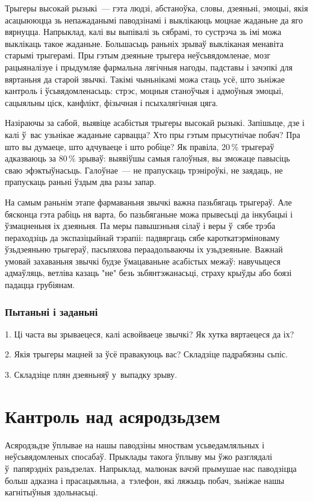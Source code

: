Трыгеры высокай рызыкі~--- гэта людзі, абстаноўка, словы, дзеяньні, эмоцыі, якія асацыююцца зь непажаданымі паводзінамі і выклікаюць моцнае жаданьне да яго вярнуцца. Напрыклад, калі вы выпівалі зь сябрамі, то сустрэча зь імі можа выклікаць такое жаданьне. Большасьць раньніх зрываў выкліканая менавіта старымі трыгерамі. Пры гэтым дзеяньне трыгера неўсьвядомленае, мозг рацыяналізуе і прыдумляе фармальна лягічныя нагоды, падставы і зачэпкі для вяртаньня да старой звычкі. Такімі чыньнікамі можа стаць усё, што зьніжае кантроль і ўсьвядомленасьць: стрэс, моцныя станоўчыя і адмоўныя эмоцыі, сацыяльны ціск, канфлікт, фізычная і псыхалягічная цяга.

Назіраючы за сабой, выявіце асабістыя трыгеры высокай рызыкі. Запішыце, дзе і калі ў~вас узьнікае жаданьне сарвацца? Хто пры гэтым прысутнічае побач? Пра што вы думаеце, што адчуваеце і што робіце? Як правіла, 20\,\% трыгераў адказваюць за 80\,\% зрываў: выявіўшы самыя галоўныя, вы зможаце павысіць сваю эфэктыўнасьць. Галоўнае~--- не прапускаць трэніроўкі, не заядаць, не прапускаць раньні ўздым два разы запар.

На самым раньнім этапе фармаваньня звычкі важна пазьбягаць трыгераў. Але бясконца гэта рабіць ня варта, бо пазьбяганьне можа прывесьці да інкубацыі і ўзмацненьня іх дзеяньня. Па меры павышэньня сілаў і веры ў~сябе трэба пераходзіць да экспазіцыйнай тэрапіі: падвяргаць сябе кароткатэрміноваму ўзьдзеяньню трыгераў, пасьпяхова пераадольваючы іх узьдзеяньне. Важнай умовай захаваньня звычкі будзе ўмацаваньне асабістых межаў: навучыцеся адмаўляць, ветліва казаць "не" безь зьбянтэжанасьці, страху крыўды або боязі падацца грубіянам.

\subsubsection{Пытаньні і заданьні}

1. Ці часта вы зрываецеся, калі асвойваеце звычкі? Як хутка вяртаецеся да іх?

2. Якія трыгеры мацней за ўсё правакуюць вас? Складзіце падрабязны сьпіс.

3. Складзіце плян дзеяньняў у~выпадку зрыву.


\section{Кантроль над асяродзьдзем}

Асяродзьдзе ўплывае на нашы паводзіны мноствам усьведамляльных і неўсьвядомленых спосабаў. Прыклады такога ўплыву мы ўжо разглядалі ў~папярэдніх разьдзелах. Напрыклад, малюнак вачэй прымушае нас паводзіцца больш адказна і прасацыяльна, а~тэлефон, які ляжыць побач, зьніжае нашы кагнітыўныя здольнасьці. 

